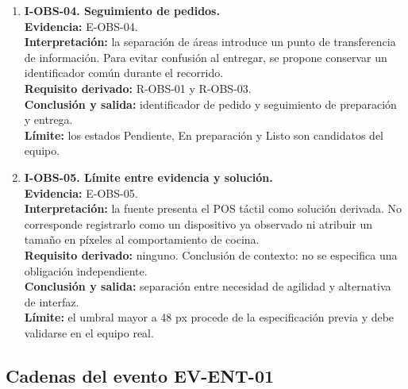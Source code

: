 \begin{enumerate}
  \item \textbf{I-OBS-04. Seguimiento de pedidos.}\\
  \textbf{Evidencia:} E-OBS-04.\\
  \textbf{Interpretación:} la separación de áreas introduce un punto de
  transferencia de información. Para evitar confusión al entregar, se
  propone conservar un identificador común durante el recorrido.\\
  \textbf{Requisito derivado:} R-OBS-01 y R-OBS-03.\\
  \textbf{Conclusión y salida:} identificador de pedido y seguimiento de
  preparación y entrega.\\
  \textbf{Límite:} los estados Pendiente, En preparación y Listo son
  candidatos del equipo.

  \item \textbf{I-OBS-05. Límite entre evidencia y solución.}\\
  \textbf{Evidencia:} E-OBS-05.\\
  \textbf{Interpretación:} la fuente presenta el POS táctil como solución
  derivada. No corresponde registrarlo como un dispositivo ya observado ni
  atribuir un tamaño en píxeles al comportamiento de cocina.\\
  \textbf{Requisito derivado:} ninguno. Conclusión de contexto: no se
  especifica una obligación independiente.\\
  \textbf{Conclusión y salida:} separación entre necesidad de agilidad y
  alternativa de interfaz.\\
  \textbf{Límite:} el umbral mayor a 48 px procede de la especificación
  previa y debe validarse en el equipo real.
\end{enumerate}

\subsection{Cadenas del evento EV-ENT-01}
\label{subsec:ilacion-ent1}

